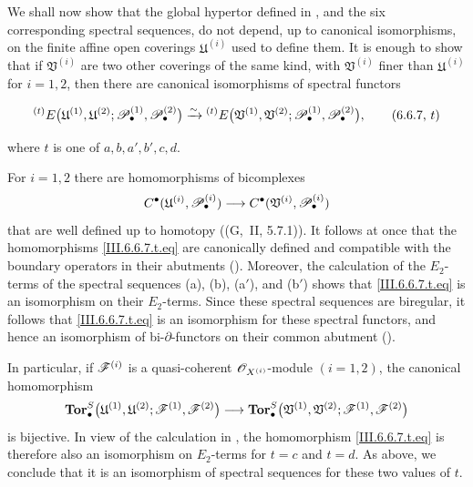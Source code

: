 \begin{env}[6.6.7]
\label{III.6.6.7}
We shall now show that the global hypertor defined in
, and the six corresponding spectral sequences,
do not depend, up to canonical isomorphisms, on the finite affine
open coverings $\mathfrak U^{(i)}$ used to define them.  It is
enough to show that if $\mathfrak V^{(i)}$ are two other
coverings of the same kind, with $\mathfrak V^{(i)}$ finer than
$\mathfrak U^{(i)}$ for $i=1,2$, then there are canonical
isomorphisms of spectral functors
\begin{env}[6.6.7, $t$]
\label{III.6.6.7.t}
\[
  {}^{(t)}E
  \bigl(
    \mathfrak U^{(1)},\mathfrak U^{(2)};
    \mathscr{P}_\bullet^{(1)},\mathscr{P}_\bullet^{(2)}
  \bigr)
  \xrightarrow{\sim}
  {}^{(t)}E
  \bigl(
    \mathfrak V^{(1)},\mathfrak V^{(2)};
    \mathscr{P}_\bullet^{(1)},\mathscr{P}_\bullet^{(2)}
  \bigr),
  \tag{6.6.7, $t$}\label{III.6.6.7.t.eq}
\]
\end{env}
where $t$ is one of $a,b,a',b',c,d$.

For $i=1,2$ there are homomorphisms of bicomplexes
\[
  C^\bullet
  (\mathfrak U^{(i)},\mathscr{P}_\bullet^{(i)})
  \longrightarrow
  C^\bullet
  (\mathfrak V^{(i)},\mathscr{P}_\bullet^{(i)})
\]
that are well defined up to homotopy
((G,~II, 5.7.1)).  It follows at once that the
homomorphisms \eqref{III.6.6.7.t.eq} are canonically defined and
compatible with the boundary operators in their abutments
().  Moreover, the calculation of the
$E_2$-terms of the spectral sequences
\textnormal{(a)}, \textnormal{(b)}, \textnormal{(a$'$)}, and
\textnormal{(b$'$)} shows that
\eqref{III.6.6.7.t.eq} is an isomorphism on their $E_2$-terms.
Since these spectral sequences are biregular, it follows that
\eqref{III.6.6.7.t.eq} is an isomorphism for these spectral
functors, and hence an isomorphism of bi-$\partial$-functors on
their common abutment ().

In particular, if $\mathscr{F}^{(i)}$ is a quasi-coherent
$\mathscr{O}_{X^{(i)}}$-module $(i=1,2)$, the canonical homomorphism
\[
  \mathbf{Tor}_\bullet^S
  \bigl(
    \mathfrak U^{(1)},\mathfrak U^{(2)};
    \mathscr{F}^{(1)},\mathscr{F}^{(2)}
  \bigr)
  \longrightarrow
  \mathbf{Tor}_\bullet^S
  \bigl(
    \mathfrak V^{(1)},\mathfrak V^{(2)};
    \mathscr{F}^{(1)},\mathscr{F}^{(2)}
  \bigr)
\]
is bijective.  In view of the calculation in
, the homomorphism
\eqref{III.6.6.7.t.eq} is therefore also an isomorphism on
$E_2$-terms for $t=c$ and $t=d$.  As above, we conclude that it
is an isomorphism of spectral sequences for these two values of
$t$.


\end{env}
